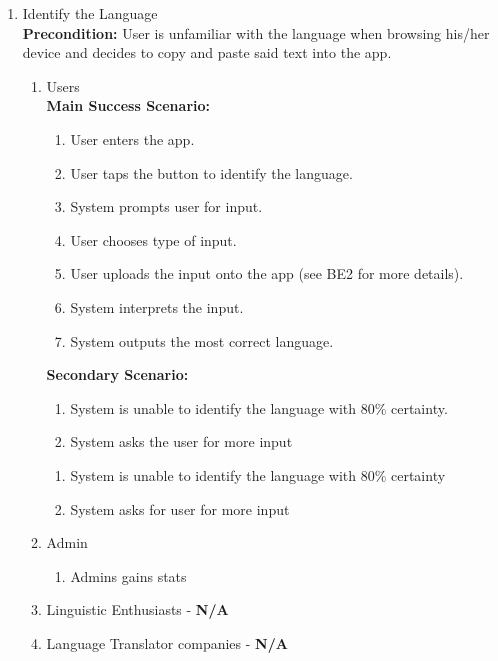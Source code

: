 \begin{enumerate}[{\bf BE1:}]
	\item Identify the Language \\
		\textbf{Precondition:} User is unfamiliar with the language when browsing his/her device and decides to copy and paste said text into the app.
		\begin{enumerate}[{\bf VP1:}]
			\item Users \\
				\textbf{Main Success Scenario:}
					\begin{enumerate}[{\bf 1.}]
						\item User enters the app.
						\item User taps the button to identify the language.
							\item System prompts user for input.
							\item User chooses type of input.
							\item User uploads the input onto the app (see BE2 for more details).
							\item System interprets the input.
							\item System outputs the most correct language.
					\end{enumerate}
					\textbf{Secondary Scenario:}
					\begin{enumerate}[{\bf 7.i.}]
						\item System is unable to identify the language with 80\% certainty.
						\item System asks the user for more input
					\end{enumerate} 
					\begin{enumerate}[{\bf 8.}]
						\item System is unable to identify the language with 80\% certainty
						\item System asks for user for more input
					\end{enumerate} 
			\item Admin
				\begin{enumerate}[resume]
					\item Admins gains stats
				\end{enumerate}
			\item Linguistic Enthusiasts - \textbf{N/A}
			\item Language Translator companies - \textbf{N/A}
		\end{enumerate}


\end{enumerate}
